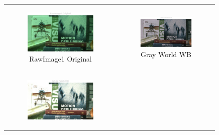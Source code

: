 \documentclass[11pt, a4]{article}
\begin{document}
\begin{enumerate}
\begin{enumerate}
\begin{figure}[h]
{\begin{tabular}{cc}
\begin{subfigure}[h]{0.45\linewidth}
							\includegraphics[width=\linewidth]{../output/RawImage1_WB_1.pdf}
							\caption{RawImage1 Original}
							\label{fig:RawImage1_WB_1}
						\end{subfigure} &
						\begin{subfigure}[h]{0.45\linewidth}
							\centering
							\includegraphics[width=\linewidth]{../output/RawImage1_WB_2.pdf}
							\caption{Gray World WB}
							\label{fig:RawImage1_WB_2}
						\end{subfigure}\\
						\begin{subfigure}[h]{0.45\linewidth}
							\centering
							\includegraphics[width=\linewidth]{../output/RawImage1_WB_3.pdf}

\end{subfigure}
\end{tabular}}
\end{figure}
\end{enumerate}
\end{enumerate}
\end{document}
